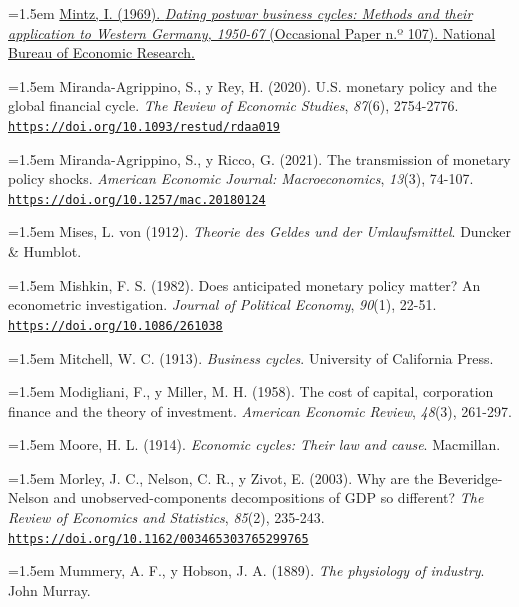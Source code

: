 \documentclass[10pt,a4paper]{article}
\begin{document}
\noindent\hangindent=1.5em \href{https://www.nber.org/books-and-chapters/dating-postwar-business-cycles-methods-and-their-application-western-germany-1950-67}{Mintz, I. (1969). \textit{Dating postwar business cycles: Methods and their application to Western Germany, 1950-67} (Occasional Paper n.º 107). National Bureau of Economic Research.}

\noindent\hangindent=1.5em Miranda-Agrippino, S., y Rey, H. (2020). U.S. monetary policy and the global financial cycle. \textit{The Review of Economic Studies}, \textit{87}(6), 2754-2776. \href{https://doi.org/10.1093/restud/rdaa019}{\nolinkurl{https://doi.org/10.1093/restud/rdaa019}}

\noindent\hangindent=1.5em Miranda-Agrippino, S., y Ricco, G. (2021). The transmission of monetary policy shocks. \textit{American Economic Journal: Macroeconomics}, \textit{13}(3), 74-107. \href{https://doi.org/10.1257/mac.20180124}{\nolinkurl{https://doi.org/10.1257/mac.20180124}}

\noindent\hangindent=1.5em Mises, L. von (1912). \textit{Theorie des Geldes und der Umlaufsmittel}. Duncker \& Humblot.

\noindent\hangindent=1.5em Mishkin, F. S. (1982). Does anticipated monetary policy matter? An econometric investigation. \textit{Journal of Political Economy}, \textit{90}(1), 22-51. \href{https://doi.org/10.1086/261038}{\nolinkurl{https://doi.org/10.1086/261038}}

\noindent\hangindent=1.5em Mitchell, W. C. (1913). \textit{Business cycles}. University of California Press.

\noindent\hangindent=1.5em Modigliani, F., y Miller, M. H. (1958). The cost of capital, corporation finance and the theory of investment. \textit{American Economic Review}, \textit{48}(3), 261-297.

\noindent\hangindent=1.5em Moore, H. L. (1914). \textit{Economic cycles: Their law and cause}. Macmillan.

\noindent\hangindent=1.5em Morley, J. C., Nelson, C. R., y Zivot, E. (2003). Why are the Beveridge-Nelson and unobserved-components decompositions of GDP so different? \textit{The Review of Economics and Statistics}, \textit{85}(2), 235-243. \href{https://doi.org/10.1162/003465303765299765}{\nolinkurl{https://doi.org/10.1162/003465303765299765}}

\noindent\hangindent=1.5em Mummery, A. F., y Hobson, J. A. (1889). \textit{The physiology of industry}. John Murray.
\end{document}
